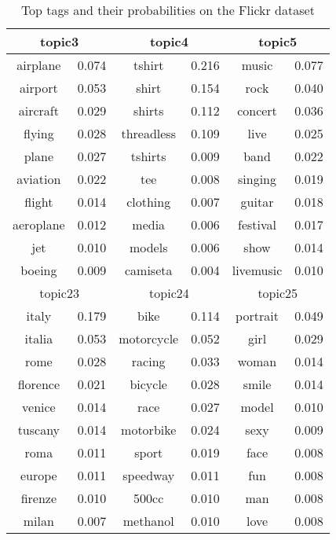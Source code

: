 \begin{table}[htp]
\caption{Top tags and their probabilities on the Flickr dataset}
\label{tab:flickrdataset}
\centering
\scriptsize
\begin{tabular}{|c|c|c|c|c|c|}
\hline
\multicolumn{2}{|c|}{topic3} & \multicolumn{2}{c|}{topic4} & \multicolumn{2}{c|}{topic5}  \\
\hline
airplane&0.074&tshirt&0.216&music&0.077\\ \hline
airport&0.053&shirt&0.154&rock&0.040\\ \hline
aircraft&0.029&shirts&0.112&concert&0.036\\ \hline
flying&0.028&threadless&0.109&live&0.025\\ \hline
plane&0.027&tshirts&0.009&band&0.022\\ \hline
aviation&0.022&tee&0.008&singing&0.019\\ \hline
flight&0.014&clothing&0.007&guitar&0.018\\ \hline
aeroplane&0.012&media&0.006&festival&0.017\\ \hline
jet&0.010&models&0.006&show&0.014\\ \hline
boeing&0.009&camiseta&0.004&livemusic&0.010\\ \hline
\hline
\multicolumn{2}{|c|}{topic23} & \multicolumn{2}{c|}{topic24} & \multicolumn{2}{c|}{topic25}  \\
\hline
italy&0.179&bike&0.114&portrait&0.049\\ \hline
italia&0.053&motorcycle&0.052&girl&0.029\\ \hline
rome&0.028&racing&0.033&woman&0.014\\ \hline
florence&0.021&bicycle&0.028&smile&0.014\\ \hline
venice&0.014&race&0.027&model&0.010\\ \hline
tuscany&0.014&motorbike&0.024&sexy&0.009\\ \hline
roma&0.011&sport&0.019&face&0.008\\ \hline
europe&0.011&speedway&0.011&fun&0.008\\ \hline
firenze&0.010&500cc&0.010&man&0.008\\ \hline
milan&0.007&methanol&0.010&love&0.008\\ \hline
\end{tabular}
\end{table}




